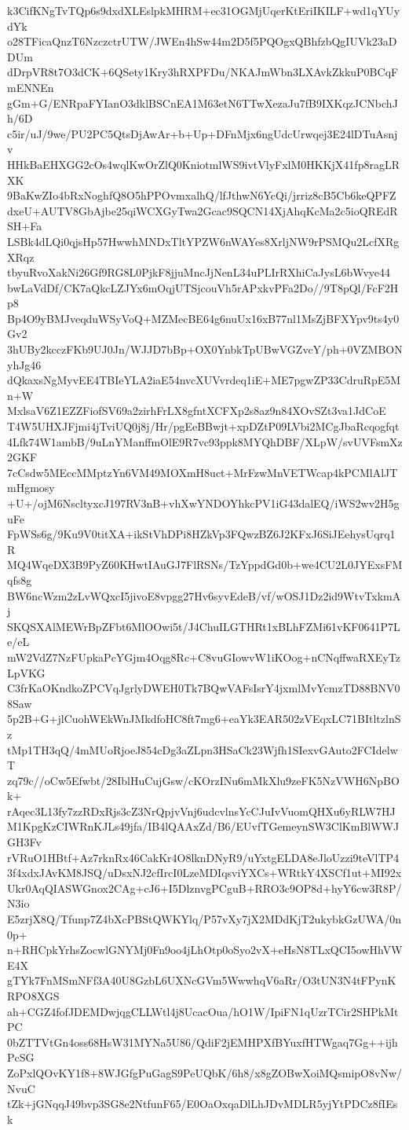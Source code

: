 k3CifKNgTvTQp6s9dxdXLEslpkMHRM+ec31OGMjUqerKtEriIKILF+wd1qYUydYk
o28TFicaQnzT6NzczctrUTW/JWEn4hSw44m2D5f5PQOgxQBhfzbQgIUVk23aDDUm
dDrpVR8t7O3dCK+6QSety1Kry3hRXPFDu/NKAJmWbn3LXAvkZkkuP0BCqFmENNEn
gGm+G/ENRpaFYIanO3dklBSCnEA1M63etN6TTwXezaJu7fB9IXKqzJCNbchJh/6D
c5ir/uJ/9we/PU2PC5QtsDjAwAr+b+Up+DFnMjx6ngUdcUrwqej3E24lDTuAsnjv
HHkBaEHXGG2cOs4wqlKwOrZlQ0KniotmlWS9ivtVlyFxlM0HKKjX41fp8ragLRXK
9BaKwZIo4bRxNoghfQ8O5hPPOvmxalhQ/lfJthwN6YcQi/jrriz8cB5Cb6keQPFZ
dxeU+AUTV8GbAjbe25qiWCXGyTwa2Gcac9SQCN14XjAhqKcMa2c5ioQREdRSH+Fa
LSBk4dLQi0qjsHp57HwwhMNDxTltYPZW6nWAYes8XrljNW9rPSMQu2LcfXRgXRqz
tbyuRvoXakNi26Gf9RG8L0PjkF8jjuMncJjNenL34uPLIrRXhiCaJysL6bWvye44
bwLaVdDf/CK7aQkcLZJYx6mOqjUTSjcouVh5rAPxkvPFa2Do//9T8pQl/FcF2Hp8
Bp4O9yBMJveqduWSyVoQ+MZMecBE64g6nuUx16xB77nl1MsZjBFXYpv9ts4y0Gv2
3hUBy2kcczFKb9UJ0Jn/WJJD7bBp+OX0YnbkTpUBwVGZvcY/ph+0VZMBONyhJg46
dQkaxsNgMyvEE4TBIeYLA2iaE54nvcXUVvrdeq1iE+ME7pgwZP33CdruRpE5Mn+W
MxlsaV6Z1EZZFiofSV69a2zirhFrLX8gfntXCFXp2s8az9n84XOvSZt3va1JdCoE
T4W5UHXJFjmi4jTviUQ0j8j/Hr/pgEeBBwjt+xpDZtP09LVbi2MCgJbaRcqogfqt
4Lfk74W1ambB/9uLnYManffmOlE9R7vc93ppk8MYQhDBF/XLpW/svUVFsmXz2GKF
7cCsdw5MEccMMptzYn6VM49MOXmH8uct+MrFzwMnVETWcap4kPCMlAlJTmHgmosy
+U+/ojM6NscltyxcJ197RV3nB+vhXwYNDOYhkcPV1iG43dalEQ/iWS2wv2H5guFe
FpWSs6g/9Ku9V0titXA+ikStVhDPi8HZkVp3FQwzBZ6J2KFxJ6SiJEehysUqrq1R
MQ4WqeDX3B9PyZ60KHwtIAuGJ7FlRSNs/TzYppdGd0b+we4CU2L0JYExsFMqfs8g
BW6ncWzm2zLvWQxcI5jivoE8vpgg27Hv6syvEdeB/vf/wOSJ1Dz2id9WtvTxkmAj
SKQSXAlMEWrBpZFbt6MlOOwi5t/J4ChuILGTHRt1xBLhFZMi61vKF0641P7Le/eL
mW2VdZ7NzFUpkaPcYGjm4Oqg8Rc+C8vuGIowvW1iKOog+nCNqffwaRXEyTzLpVKG
C3frKaOKndkoZPCVqJgrlyDWEH0Tk7BQwVAFsIsrY4jxmlMvYcmzTD88BNV08Saw
5p2B+G+jlCuohWEkWnJMkdfoHC8ft7mg6+eaYk3EAR502zVEqxLC71BItltzlnSz
tMp1TH3qQ/4mMUoRjoeJ854cDg3aZLpn3HSaCk23Wjfh1SIexvGAuto2FCIdelwT
zq79c//oCw5Efwbt/28IblHuCujGsw/cKOrzINu6mMkXlu9zeFK5NzVWH6NpBOk+
rAqec3L13fy7zzRDxRjs3cZ3NrQpjvVnj6udcvlnsYcCJuIvVuomQHXu6yRLW7HJ
M1KpgKzCIWRnKJLs49jfa/IB4lQAAxZd/B6/EUvfTGemeynSW3ClKmBlWWJGH3Fv
rVRuO1HBtf+Az7rknRx46CakKr4O8lknDNyR9/uYxtgELDA8eJloUzzi9teVlTP4
3f4xdxJAvKM8JSQ/uDsxNJ2cfIrcI0LzeMDIqsviYXCs+WRtkY4XSCf1ut+MI92x
Ukr0AqQIASWGnox2CAg+cJ6+I5DlznvgPCguB+RRO3c9OP8d+hyY6cw3R8P/N3io
E5zrjX8Q/Tfunp7Z4bXcPBStQWKYlq/P57vXy7jX2MDdKjT2ukybkGzUWA/0n0p+
n+RHCpkYrhsZocwlGNYMj0Fn9oo4jLhOtp0oSyo2vX+eHsN8TLxQCI5owHhVWE4X
gTYk7FnMSmNFf3A40U8GzbL6UXNcGVm5WwwhqV6aRr/O3tUN3N4tFPynKRPO8XGS
ah+CGZ4fofJDEMDwjqgCLLWtl4j8UcacOua/hO1W/IpiFN1qUzrTCir2SHPkMtPC
0bZTTVtGn4oss68HsW31MYNa5U86/QdiF2jEMHPXfBYuxfHTWgaq7Gg++ijhPcSG
ZoPxlQOvKY1f8+8WJGfgPuGagS9PeUQbK/6h8/x8gZOBwXoiMQsmipO8vNw/NvuC
tZk+jGNqqJ49bvp3SG8e2NtfunF65/E0OaOxqaDlLhJDvMDLR5yjYtPDCz8fIEsk

